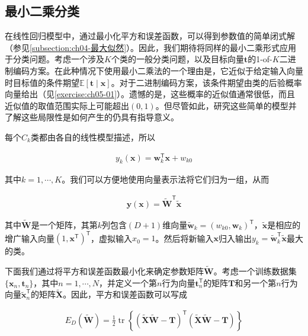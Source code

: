\documentclass[../../main.tex]{subfiles}
\begin{document}
\subsection{最小二乘分类}\label{subsection:ch05-最小二乘分类}

在线性回归模型中，通过最小化平方和误差函数，可以得到参数值的简单闭式解（参见\cref{subsection:ch04-最大似然}）。因此，我们期待将同样的最小二乘形式应用于分类问题。考虑一个涉及$K$个类的一般分类问题，以及目标向量$\boldsymbol{t}$的1-of-$K$二进制编码方案。在此种情况下使用最小二乘法的一个理由是，它近似于给定输入向量时目标值的条件期望$\mathbb{E}[\boldsymbol{t}\mid\boldsymbol{x}]$。对于二进制编码方案，该条件期望由类的后验概率向量给出（见\cref{exercise:ch05-01}）。遗憾的是，这些概率的近似值通常很低，而且近似值的取值范围实际上可能超出$(0,1)$。但尽管如此，研究这些简单的模型并了解这些局限性是如何产生的仍具有指导意义。

每个$C_k$类都由各自的线性模型描述，所以

\begin{align}
  y_k(\boldsymbol{x})=\boldsymbol{w}_k^{\mathsf{T}}\boldsymbol{x}+w_{k0}
  \label{align:ch05-多类线性模型}
\end{align}

其中$k=1,\cdots,K$。我们可以方便地使用向量表示法将它们归为一组，从而

\begin{align}
  \boldsymbol{y}(\boldsymbol{x})=\tilde{\boldsymbol{W}}^{\mathsf{T}}\tilde{\boldsymbol{x}}
  \label{align:ch05-矩阵判别}
\end{align}

其中$\tilde{\boldsymbol{W}}$是一个矩阵，其第$k$列包含$(D+1)$维向量$\tilde{\boldsymbol{w}}_k=(w_{k0},\boldsymbol{w}_k)^{\mathsf{T}}$，$\tilde{\boldsymbol{x}}$是相应的增广输入向量$(1,\boldsymbol{x}^{\mathsf{T}})^{\mathsf{T}}$，虚拟输入$x_0=1$。然后将新输入$\boldsymbol{x}$归入输出$y_k=\tilde{\boldsymbol{w}}_k^{\mathsf{T}}\tilde{\boldsymbol{x}}$最大的类。

下面我们通过将平方和误差函数最小化来确定参数矩阵$\tilde{\boldsymbol{W}}$。考虑一个训练数据集$\{\boldsymbol{x}_n,\boldsymbol{t}_n\}$，其中$n=1,\cdots,N$，并定义一个第$n$行为向量$\boldsymbol{t}_n^{\mathsf{T}}$的矩阵$\boldsymbol{T}$和另一个第$n$行为向量$\tilde{\boldsymbol{x}}_n^{\mathsf{T}}$的矩阵$\tilde{\boldsymbol{X}}$。因此，平方和误差函数可以写成

\begin{align}
  E_D(\tilde{\boldsymbol{W}})=\frac{1}{2}\operatorname{tr}\left\{(\tilde{\boldsymbol{X}}\tilde{\boldsymbol{W}}-\boldsymbol{T})^{\mathsf{T}}(\tilde{\boldsymbol{X}}\tilde{\boldsymbol{W}}-\boldsymbol{T})\right\}
  \label{align:ch05-平方和分类误差}
\end{align}
\end{document}
